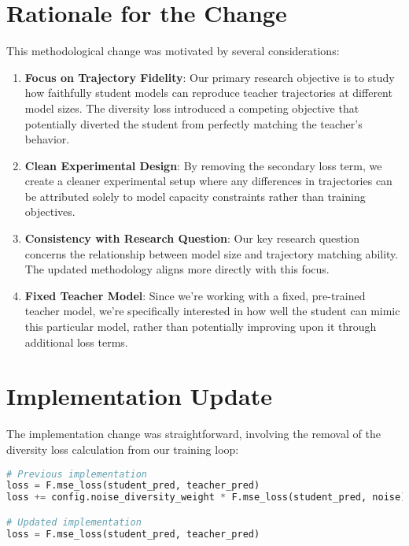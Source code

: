 \documentclass{article}
\begin{document}
\section{Rationale for the Change}

This methodological change was motivated by several considerations:

\begin{enumerate}
  \item \textbf{Focus on Trajectory Fidelity}: Our primary research objective is to study how faithfully student models can reproduce teacher trajectories at different model sizes. The diversity loss introduced a competing objective that potentially diverted the student from perfectly matching the teacher's behavior.
  
  \item \textbf{Clean Experimental Design}: By removing the secondary loss term, we create a cleaner experimental setup where any differences in trajectories can be attributed solely to model capacity constraints rather than training objectives.
  
  \item \textbf{Consistency with Research Question}: Our key research question concerns the relationship between model size and trajectory matching ability. The updated methodology aligns more directly with this focus.
  
  \item \textbf{Fixed Teacher Model}: Since we're working with a fixed, pre-trained teacher model, we're specifically interested in how well the student can mimic this particular model, rather than potentially improving upon it through additional loss terms.
\end{enumerate}

\section{Implementation Update}

The implementation change was straightforward, involving the removal of the diversity loss calculation from our training loop:

\begin{lstlisting}[language=Python, frame=single]
# Previous implementation
loss = F.mse_loss(student_pred, teacher_pred)
loss += config.noise_diversity_weight * F.mse_loss(student_pred, noise)

# Updated implementation
loss = F.mse_loss(student_pred, teacher_pred)
\end{lstlisting}
\end{document}

